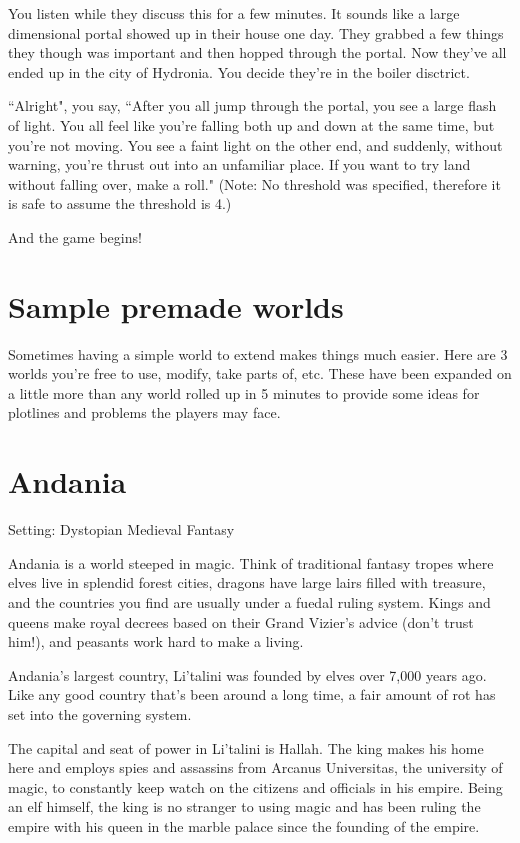 You listen while they discuss this for a few minutes. It sounds like a large
dimensional portal showed up in their house one day. They grabbed a few things
they though was important and then hopped through the portal. Now they've all
ended up in the city of Hydronia. You decide they're in the boiler disctrict.

``Alright", you say, ``After you all jump through the portal, you see a large
flash of light. You all feel like you're falling both up and down at the same
time, but you're not moving. You see a faint light on the other end, and
suddenly, without warning, you're thrust out into an unfamiliar place. If you
want to try land without falling over, make a roll." (Note: No threshold was
specified, therefore it is safe to assume the threshold is 4.)

And the game begins!

\section*{Sample premade worlds}

Sometimes having a simple world to extend makes things much easier. Here are
3 worlds you're free to use, modify, take parts of, etc. These have been
expanded on a little more than any world rolled up in 5 minutes to provide
some ideas for plotlines and problems the players may face.

\section*{Andania}

Setting: Dystopian Medieval Fantasy

Andania is a world steeped in magic. Think of traditional fantasy tropes where
elves live in splendid forest cities, dragons have large lairs filled with
treasure, and the countries you find are usually under a fuedal ruling system.
Kings and queens make royal decrees based on their Grand Vizier's advice (don't
trust him!), and peasants work hard to make a living.

Andania's largest country, Li'talini was founded by elves over 7,000 years ago.
Like any good country that's been around a long time, a fair amount of rot has
set into the governing system.

The capital and seat of power in Li'talini is Hallah. The king makes his home
here and employs spies and assassins from Arcanus Universitas, the university
of magic, to constantly keep watch on the citizens and officials in his empire.
Being an elf himself, the king is no stranger to using magic and has been
ruling the empire with his queen in the marble palace since the founding of
the empire.

